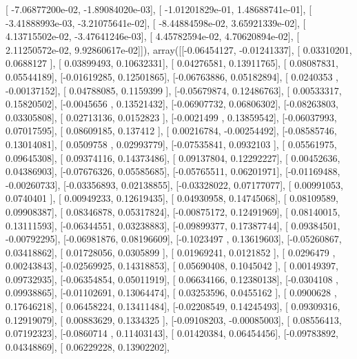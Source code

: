 \documentclass{article}
\begin{document}
       [ -7.06877200e-02,  -1.89084020e-03],
       [ -1.01201829e-01,   1.48688741e-01],
       [ -3.41888993e-03,  -3.21075641e-02],
       [ -8.44884598e-02,   3.65921339e-02],
       [  4.13715502e-02,  -3.47641246e-03],
       [  4.45782594e-02,   4.70620894e-02],
       [  2.11250572e-02,   9.92860617e-02]]), array([[-0.06454127, -0.01241337],
       [ 0.03310201,  0.0688127 ],
       [ 0.03899493,  0.10632331],
       [ 0.04276581,  0.13911765],
       [ 0.08087831,  0.05544189],
       [-0.01619285,  0.12501865],
       [-0.06763886,  0.05182894],
       [ 0.0240353 , -0.00137152],
       [ 0.04788085,  0.1159399 ],
       [-0.05679874,  0.12486763],
       [ 0.00533317,  0.15820502],
       [-0.0045656 ,  0.13521432],
       [-0.06907732,  0.06806302],
       [-0.08263803,  0.03305808],
       [ 0.02713136,  0.0152823 ],
       [-0.0021499 ,  0.13859542],
       [-0.06037993,  0.07017595],
       [ 0.08609185,  0.137412  ],
       [ 0.00216784, -0.00254492],
       [-0.08585746,  0.13014081],
       [ 0.0509758 ,  0.02993779],
       [-0.07535841,  0.0932103 ],
       [ 0.05561975,  0.09645308],
       [ 0.09374116,  0.14373486],
       [ 0.09137804,  0.12292227],
       [ 0.00452636,  0.04386903],
       [-0.07676326,  0.05585685],
       [-0.05765511,  0.06201971],
       [-0.01169488, -0.00260733],
       [-0.03356893,  0.02138855],
       [-0.03328022,  0.07177077],
       [ 0.00991053,  0.0740401 ],
       [ 0.00949233,  0.12619435],
       [ 0.04930958,  0.14745068],
       [ 0.08109589,  0.09908387],
       [ 0.08346878,  0.05317824],
       [-0.00875172,  0.12491969],
       [ 0.08140015,  0.13111593],
       [-0.06344551,  0.03238883],
       [-0.09899377,  0.17387744],
       [ 0.09384501, -0.00792295],
       [-0.06981876,  0.08196609],
       [-0.1023497 ,  0.13619603],
       [-0.05260867,  0.03418862],
       [ 0.01728056,  0.0305899 ],
       [ 0.01969241,  0.0121852 ],
       [ 0.0296479 ,  0.00243843],
       [-0.02569925,  0.14318853],
       [ 0.05690408,  0.1045042 ],
       [ 0.00149397,  0.09732935],
       [-0.06354854,  0.05011919],
       [ 0.06634166,  0.12380138],
       [-0.0304108 ,  0.09938865],
       [-0.01102691,  0.13064474],
       [ 0.03253596,  0.0455162 ],
       [ 0.0900628 ,  0.17646218],
       [ 0.06458224,  0.13411484],
       [-0.02208549,  0.14245493],
       [ 0.09309316,  0.12919079],
       [ 0.00883629,  0.1334325 ],
       [-0.09108203, -0.00085003],
       [ 0.08556413,  0.07192323],
       [-0.0860714 ,  0.11403143],
       [ 0.01420384,  0.06454456],
       [-0.09783892,  0.04348869],
       [ 0.06229228,  0.13902202],
\end{document}
